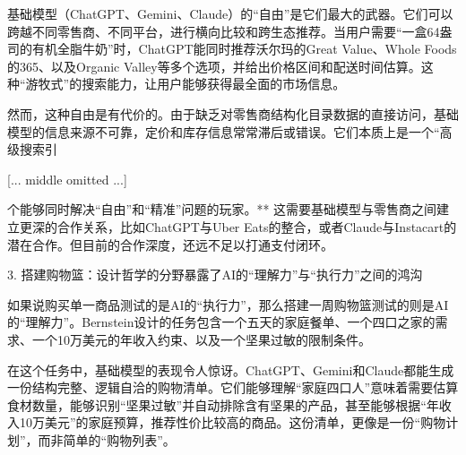 \documentclass[11pt]{ctexart}
\begin{document}
基础模型（ChatGPT、Gemini、Claude）的“自由”是它们最大的武器。它们可以跨越不同零售商、不同平台，进行横向比较和跨生态推荐。当用户需要“一盒64盎司的有机全脂牛奶”时，ChatGPT能同时推荐沃尔玛的Great Value、Whole Foods的365、以及Organic Valley等多个选项，并给出价格区间和配送时间估算。这种“游牧式”的搜索能力，让用户能够获得最全面的市场信息。

然而，这种自由是有代价的。由于缺乏对零售商结构化目录数据的直接访问，基础模型的信息来源不可靠，定价和库存信息常常滞后或错误。它们本质上是一个“高级搜索引

[... middle omitted ...]

个能够同时解决“自由”和“精准”问题的玩家。** 这需要基础模型与零售商之间建立更深的合作关系，比如ChatGPT与Uber Eats的整合，或者Claude与Instacart的潜在合作。但目前的合作深度，还远不足以打通支付闭环。

3. 搭建购物篮：设计哲学的分野暴露了AI的“理解力”与“执行力”之间的鸿沟

如果说购买单一商品测试的是AI的“执行力”，那么搭建一周购物篮测试的则是AI的“理解力”。Bernstein设计的任务包含一个五天的家庭餐单、一个四口之家的需求、一个10万美元的年收入约束、以及一个坚果过敏的限制条件。

在这个任务中，基础模型的表现令人惊讶。ChatGPT、Gemini和Claude都能生成一份结构完整、逻辑自洽的购物清单。它们能够理解“家庭四口人”意味着需要估算食材数量，能够识别“坚果过敏”并自动排除含有坚果的产品，甚至能够根据“年收入10万美元”的家庭预算，推荐性价比较高的商品。这份清单，更像是一份“购物计划”，而非简单的“购物列表”。
\end{document}
